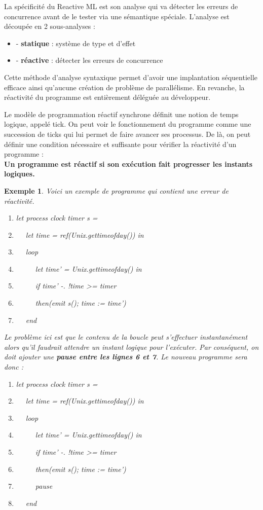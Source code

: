 \documentclass[10pt,a4paper]{report}
\newtheorem{ex}{Exemple}
\begin{document}
	La spécificité du Reactive ML est son analyse qui va détecter les erreurs de concurrence avant de le tester via une sémantique spéciale. L'analyse est découpée en 2 sous-analyses :
	\begin{itemize}
		\item[] - \textbf{statique} : système de type et d'effet
		\item[] - \textbf{réactive} : détecter les erreurs de concurrence
	\end{itemize}
	\medbreak
	
	Cette méthode d'analyse syntaxique permet d'avoir une implantation séquentielle efficace ainsi qu'aucune création de problème de parallélisme. En revanche, la réactivité du programme est entièrement déléguée au développeur.
	\medbreak
	
	Le modèle de programmation réactif synchrone définit une notion de temps logique, appelé tick. On peut voir le fonctionnement du programme comme une succession de ticks qui lui permet de faire avancer ses processus. De là, on peut définir une condition nécessaire et suffisante pour vérifier la réactivité d'un programme : 
	\\\textbf{Un programme est r\'{e}actif si son ex\'{e}cution fait progresser les instants logiques.}
	\medbreak
	
	\begin{ex}
		Voici un exemple de programme qui contient une erreur de réactivité.
		\begin{enumerate}
			\item let process clock timer s =
			\item $\quad$ let time = ref(Unix.gettimeofday()) in
			\item $\quad$ loop
			\item $\quad$ $\quad$ let time' = Unix.gettimeofday() in
			\item $\quad$ $\quad$ if time' -. !time >= timer
			\item $\quad$ $\quad$ then(emit s(); time := time')
			\item $\quad$ end 
		\end{enumerate}
		\bigbreak


		Le problème ici est que le contenu de la boucle peut s'effectuer instantanément alors qu'il faudrait attendre un instant logique pour l'exécuter. Par conséquent, on doit ajouter une \textbf{pause entre les lignes 6 et 7}. Le nouveau programme sera donc :
		\smallbreak
		\begin{enumerate}
			\item let process clock timer s =
			\item $\quad$ let time = ref(Unix.gettimeofday()) in
			\item $\quad$ loop
			\item $\quad$ $\quad$ let time' = Unix.gettimeofday() in
			\item $\quad$ $\quad$ if time' -. !time >= timer
			\item $\quad$ $\quad$ then(emit s(); time := time')
			\item $\quad$ $\quad$ pause
			\item $\quad$ end 
		\end{enumerate}
	\end{ex}
	\bigbreak
	
\end{document}
